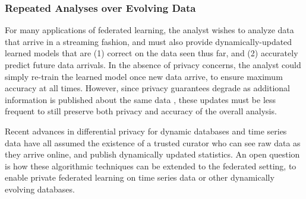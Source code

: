 \documentclass[11pt]{article}
\begin{document}
\subsubsection{Repeated Analyses over Evolving Data}
\label{sssec:repeated_analyses}

For many applications of federated learning, the analyst wishes to analyze data that arrive in a streaming fashion, and must also provide dynamically-updated learned models that are (1) correct on the data seen thus far, and (2) accurately predict future data arrivals.  In the absence of privacy concerns, the analyst could simply re-train the learned model once new data arrive, to ensure maximum accuracy at all times.  However, since privacy guarantees degrade as additional information is published about the same data \cite{DMNS06,DRV10}, these updates must be less frequent to still preserve both privacy and accuracy of the overall analysis.

Recent advances in differential privacy for dynamic databases and time series data \cite{CKM+18,CKLT18, CKM+18b} have all assumed the existence of a trusted curator who can see raw data as they arrive online, and publish dynamically updated statistics.  An open question is how these algorithmic techniques can be extended to the federated setting, to enable private federated learning on time series data or other dynamically evolving databases.
\end{document}
